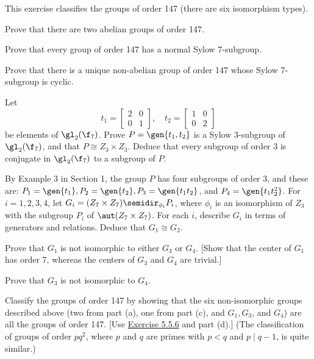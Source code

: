 \begin{specialexercise}\label{ex5.5.10}
    This exercise classifies the groups of order 147 (there are six isomorphism types).
    \begin{subproblems}
        \item Prove that there are two abelian groups of order 147.
        \item Prove that every group of order 147 has a normal Sylow 7-subgroup.
        \item Prove that there is a unique non-abelian group of order 147 whose Sylow 7-subgroup is cyclic.
        \item Let
        \[t_1 = 
        \begin{bmatrix}
            2 & 0 \\
            0 & 1
        \end{bmatrix}, \quad
        t_2 = 
        \begin{bmatrix}
            1 & 0 \\
            0 & 2
        \end{bmatrix}\]
        be elements of $\gl_2(\f_7)$. Prove $P = \gen{t_1, t_2}$ is a Sylow 3-subgroup of $\gl_2(\f_7)$, and that $P \cong Z_3 \times Z_3$. Deduce that every subgroup of order 3 is conjugate in $\gl_2(\f_7)$ to a subgroup of $P$.
        \item By Example 3 in Section 1, the group $P$ has four subgroups of order 3, and these are: $P_1 = \gen{t_1}, P_2 = \gen{t_2}, P_3 = \gen{t_1t_2}$, and $P_4 = \gen{t_1t_2^2}$. For $i = 1, 2, 3, 4$, let $G_i = (Z_7 \times Z_7) \semidir_{\phi_i} P_i$, where $\phi_i$ is an isomorphism of $Z_3$ with the subgroup $P_i$ of $\aut(Z_7 \times Z_7)$. For each $i$, describe $G_i$ in terms of generators and relations. Deduce that $G_1 \cong G_2$.
        \item Prove that $G_1$ is not isomorphic to either $G_3$ or $G_4$. [Show that the center of $G_1$ has order 7, whereas the centers of $G_3$ and $G_4$ are trivial.]
        \item Prove that $G_3$ is not isomorphic to $G_4$.
        \item Classify the groups of order 147 by showing that the six non-isomorphic groups described above (two from part (a), one from part (c), and $G_1, G_3$, and $G_4$) are all the groups of order 147. [Use \hyperref[ex5.5.6]{Exercise 5.5.6} and part (d).] (The classification of groups of order $pq^2$, where $p$ and $q$ are primes with $p < q$ and $p \mid q - 1$, is quite similar.)
    \end{subproblems}
\end{specialexercise}


